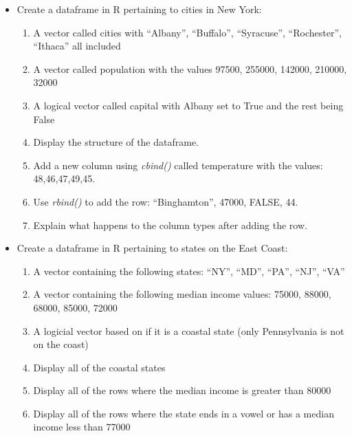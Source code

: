 \documentclass[
  letterpaper,
  DIV=11,
  numbers=noendperiod]{scrreprt}
\providecommand{\tightlist}{%
  \setlength{\itemsep}{0pt}\setlength{\parskip}{0pt}}
\begin{document}
\begin{itemize}
\tightlist
\item
  Create a dataframe in R pertaining to cities in New York:

  \begin{enumerate}
  \def\labelenumi{\alph{enumi})}
  \tightlist
  \item
    A vector called cities with ``Albany'', ``Buffalo'', ``Syracuse'',
    ``Rochester'', ``Ithaca'' all included\\
  \item
    A vector called population with the values 97500, 255000, 142000,
    210000, 32000
  \item
    A logical vector called capital with Albany set to True and the rest
    being False
  \item
    Display the structure of the dataframe.
  \item
    Add a new column using \emph{cbind()} called temperature with the
    values: 48,46,47,49,45.
  \item
    Use \emph{rbind()} to add the row: ``Binghamton'', 47000, FALSE, 44.
  \item
    Explain what happens to the column types after adding the row.
  \end{enumerate}
\item
  Create a dataframe in R pertaining to states on the East Coast:

  \begin{enumerate}
  \def\labelenumi{\alph{enumi})}
  \tightlist
  \item
    A vector containing the following states: ``NY'', ``MD'', ``PA'',
    ``NJ'', ``VA''
  \item
    A vector containing the following median income values: 75000,
    88000, 68000, 85000, 72000
  \item
    A logicial vector based on if it is a coastal state (only
    Pennsylvania is not on the coast)
  \item
    Display all of the coastal states
  \item
    Display all of the rows where the median income is greater than
    80000
  \item
    Display all of the rows where the state ends in a vowel or has a
    median income less than 77000
  \end{enumerate}
\end{itemize}

\end{document}
